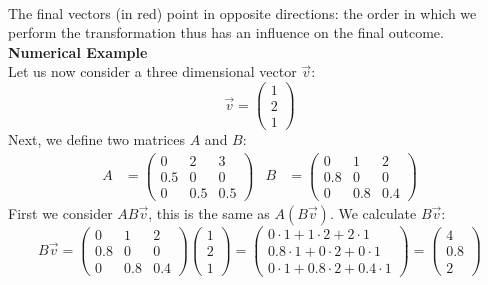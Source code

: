 \documentclass[a4paper]{report}
\begin{document}
\begin{mdframed}[backgroundcolor=exampcol]
\\
The final vectors (in red) point in opposite directions: the order in which we perform the transformation thus has an influence on the final outcome.\\
\textbf{Numerical Example}\\
Let us now consider a three dimensional vector $\vec{v}$:
\begin{equation*}
\vec{v}=\begin{pmatrix} 1\\2\\1\end{pmatrix} 
\end{equation*}
Next, we define two matrices $A$ and $B$:
\begin{align*}
A&=\begin{pmatrix} 0 & 2 & 3\\0.5 & 0 & 0\\0 & 0.5 & 0.5 \end{pmatrix} &
B&=\begin{pmatrix} 0 & 1 & 2\\0.8 & 0 & 0\\0 & 0.8 & 0.4 \end{pmatrix} 
\end{align*}
First we consider $AB\vec{v}$, this is the same as $A(B\vec{v})$. We calculate $B\vec{v}$:
\begin{equation*}
B\vec{v}=\begin{pmatrix} 0 & 1 & 2\\0.8 & 0 & 0\\0 & 0.8 & 0.4 \end{pmatrix} \begin{pmatrix} 1\\2\\1\end{pmatrix} = \begin{pmatrix} 0\cdot 1 + 1\cdot 2 + 2 \cdot 1\\0.8 \cdot 1 + 0\cdot 2 + 0 \cdot 1\\0 \cdot 1 + 0.8 \cdot 2 +0.4 \cdot 1\end{pmatrix}=\begin{pmatrix}4\\0.8\\2\end{pmatrix}

\end{equation*}
\end{mdframed}
\end{document}
